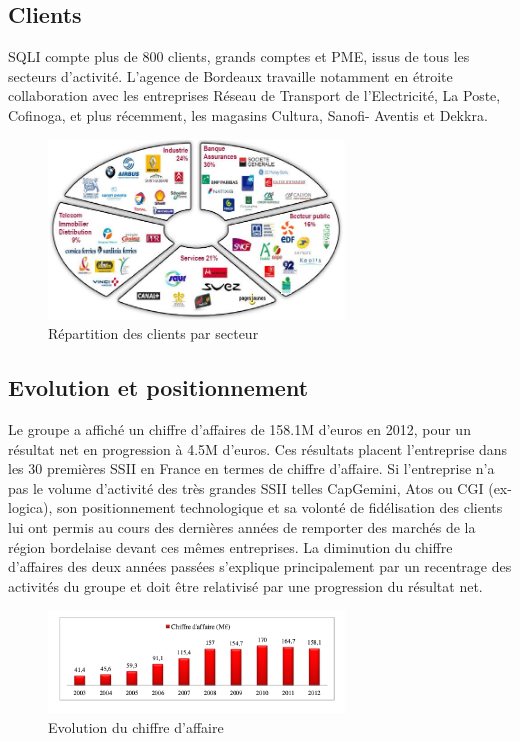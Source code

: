 \documentclass{report}
\begin{document}
\subsection{Clients}
SQLI compte plus de 800 clients, grands comptes et PME, issus de tous les secteurs d’activité.
L’agence de Bordeaux travaille notamment en étroite collaboration avec les entreprises Réseau de
Transport de l’Electricité, La Poste, Cofinoga, et plus récemment, les magasins Cultura, Sanofi-
Aventis et Dekkra.

\begin{figure}[h!]
	\centering
	\includegraphics[width=0.7\textwidth]{assets/clients.jpg}
	\caption{Répartition des clients par secteur }
\end{figure}


\subsection{Evolution et positionnement}
Le groupe a affiché un chiffre d’affaires de 158.1M d'euros en 2012, pour un résultat net en progression à
4.5M d'euros. Ces résultats placent l’entreprise dans les 30 premières SSII en France en termes de chiffre
d’affaire. Si l’entreprise n’a pas le volume d’activité des très grandes SSII telles CapGemini, Atos ou
CGI (ex-logica), son positionnement technologique et sa volonté de fidélisation des clients lui ont permis au
cours des dernières années de remporter des marchés de la région bordelaise devant ces mêmes
entreprises. La diminution du chiffre d’affaires des deux années passées s’explique principalement
par un recentrage des activités du groupe et doit être relativisé par une progression du résultat net.




\begin{figure}[h!]
	\centering
	\includegraphics[width=0.7\textwidth]{assets/evol_ca.png}
	\caption{Evolution du chiffre d'affaire}
\end{figure}
\end{document}
